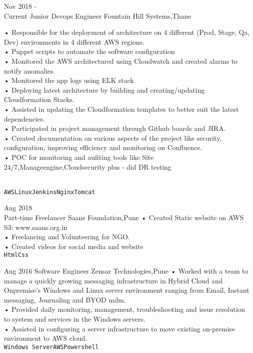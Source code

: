 \documentclass[9pt]{developercv} %
\begin{document}

\begin{entrylist}
	\entry
		{Nov 2018 -\\Current}
		{Junior Devops Engineer}
		{Fountain Hill Systems,Thane}
		{
		• Responsible for the deployment of architecture on 4 different (Prod, Stage, Qa, Dev) environments in 4 different AWS regions.\\
		• Puppet scripts to automate the software configuration\\
		• Monitored the AWS architectured using Cloudwatch and created alarms to notify anomalies.\\
		• Monitored the app logs using ELK stack\\
 • Deploying latest architecture by building and creating/updating Cloudformation Stacks.\\
 • Assisted in updating the Cloudformation templates to better suit the latest dependencies.\\
 • Participated in project management through Github boards and JIRA.\\
 • Created documentation on various aspects of the project like security, configuration, improving efficiency and monitoring on Confluence.\\
  • POC for monitoring and aufiting tools like Site 24/7,Manageengine,Cloudsecurity plus
- did DR testing
 

\\ \texttt{AWS}\slashsep\texttt{Linux}\slashsep\texttt{Jenkins}\slashsep\texttt{Nginx}\slashsep\texttt{Tomcat}}
	\entry
		{Aug 2018\\\footnotesize{Part-time}}
		{Freelancer}
		{Saans Foundation,Pune}
		{• Created Static website on AWS S3: www.saans.org.in \\ 
	    • Freelancing and Volunteering for NGO. \\
	   • Created videos for social media and website\\\texttt{Html}\slashsep\texttt{Css}}
		
	\entry
		{Aug 2016}
		{Software Engineer}
		{Zensar Technologies,Pune}
		{• Worked with a team to manage a quickly growing messaging infrastructure in Hybrid Cloud and Onpremise's Windows and Linux server
environment ranging
from Email, Instant messaging, Journaling and BYOD mdm.\\• Provided daily monitoring, management, troubleshooting and issue resolution to
system and services in the Windows servers.\\ • Assisted in configuring a server infrastructure to move existing on-premise
environment to AWS cloud.\\ \texttt{Windows Server}\slashsep\texttt{AWS}\slashsep\texttt{Powershell}}
\end{entrylist}
\end{document}
